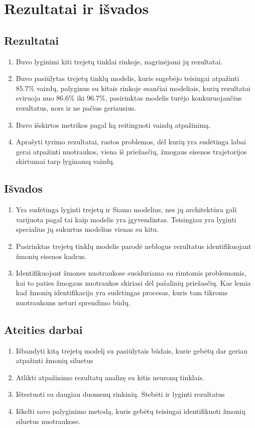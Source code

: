 \documentclass{VUMIFPSkursinis}
\DeclareRobustCommand{\[}{\begin{equation}}
\DeclareRobustCommand{\]}{\end{equation}}
\begin{document}
\section{Rezultatai ir išvados}
\thispagestyle{empty} 
\subsection{Rezultatai}
\begin{enumerate}
\item{Buvo lyginimi kiti trejetų tinklai rinkoje, nagrinėjami jų rezultatai.}
\item{Buvo pasiūlytas trejetų tinklų modelis, kuris sugebėjo teisingai atpažinti 85.7\% vaizdų, palyginus su kitais rinkoje esančiai modeliais, kurių rezultatai sviruoja nuo 86.6\% iki 96.7\%, pasirinktas modelis turėjo konkuruojančius rezultatus, nors ir ne pačius geriausius.}
\item{Buvo išskirtos metrikos pagal ką reitinguoti vaizdų atpažinimą.}
\item{Aprašyti tyrimo rezultatai, rastos problemos, dėl kurių yra sudėtinga labai gerai atpažinti nuotraukos, viena iš priežasčių, žmogaus eisenos trajetorijos skirtumai tarp lyginamų vaizdų.}
\end{enumerate}
\subsection{Išvados}
\begin{enumerate}
\item{Yra sudėtinga lyginti trejetų ir Siamo modelius, nes jų architektūra gali varijuota pagal tai kaip modelis yra įgyvendintas. Teisingiau yra lyginti specialius jų sukurtus modelius vienas su kitu.}
\item{Pasirinktas trejetų tinklų modelis parodė neblogus rezultatus identifikuojant žmonių eisenos kadrus.}
\item{Identifikuojant žmones nuotraukose susiduriama su rimtomis problemomis, kai to paties žmogaus nuotraukos skiriasi dėl pašalinių priežasčių. Kas lemia kad žmonių identifikacija yra sudėtingas procesas, kuris tam tikroms nuotraukoms neturi sprendimo būdų.}
\end{enumerate}
\subsection{Ateities darbai}
\begin{enumerate}
\item{Išbandyti kitą trejetų modelį su pasiūlytais būdais, kurie gebėtų dar geriau atpažinti žmonių siluetus}
\item{Atlikti atpažinimo rezultatų analizę su kitis neuronų tinklais.}
\item{Ištestuoti su daugiau duomenų rinkinių. Stebėti ir lyginti rezultatus}
\item{Iškelti savo palyginimo metodą, kuris gebėtų teisingai identifikuoti žmonių siluetus nuotraukose.}
\end{enumerate}
\pagebreak
\end{document}
